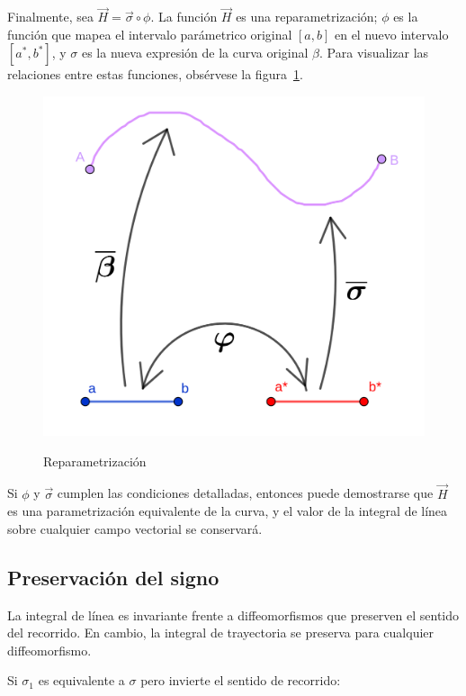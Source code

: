\documentclass{article}
\begin{document}
Finalmente, sea $\overrightarrow{H} = \overrightarrow{\sigma} \circ \phi$. La función $\overrightarrow{H}$ es una reparametrización; $\phi$ es la función que mapea el intervalo parámetrico original $[a,b]$ en el nuevo intervalo $[a^*, b^*]$, y $\sigma$ es la nueva expresión de la curva original $\beta$. Para visualizar las relaciones entre estas funciones, obsérvese la figura~\ref{fig:reparam}.

\begin{figure}[ht]
\centering
\caption{Reparametrización}
\includegraphics[scale=0.7]{img/teo_fig020_re.png}
\label{fig:reparam}
\end{figure}

Si $\phi$ y $\overrightarrow{\sigma}$ cumplen las condiciones detalladas, entonces puede demostrarse que $\overrightarrow{H}$ es una parametrización equivalente de la curva, y el valor de la integral de línea sobre cualquier campo vectorial se conservará.

\subsection{Preservación del signo}

La integral de línea es invariante frente a diffeomorfismos que preserven el sentido del recorrido. En cambio, la integral de trayectoria se preserva para cualquier diffeomorfismo.

Si $\sigma_1$ es equivalente a $\sigma$ pero invierte el sentido de recorrido:
\end{document}

